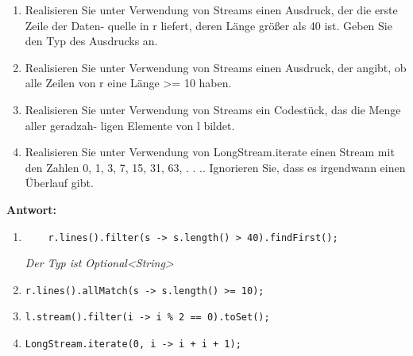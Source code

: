 \begin{enumerate}
    \item Realisieren Sie unter Verwendung von Streams einen Ausdruck, der die erste
          Zeile der Daten- quelle in r liefert, deren Länge größer als 40 ist. Geben Sie
          den Typ des Ausdrucks an.
    \item Realisieren Sie unter Verwendung von Streams einen Ausdruck, der angibt, ob
          alle Zeilen von r eine Länge >= 10 haben.
    \item Realisieren Sie unter Verwendung von Streams ein Codestück, das die Menge aller
          geradzah- ligen Elemente von l bildet.
    \item Realisieren Sie unter Verwendung von LongStream.iterate einen Stream mit den
          Zahlen 0, 1, 3, 7, 15, 31, 63, . . .. Ignorieren Sie, dass es irgendwann einen
          Überlauf gibt.
\end{enumerate}

\textbf{Antwort:}

\begin{enumerate}
    \item \begin{lstlisting}
    r.lines().filter(s -> s.length() > 40).findFirst();
\end{lstlisting} \textit{Der Typ ist Optional<String>}
    \item \begin{lstlisting}
r.lines().allMatch(s -> s.length() >= 10);
\end{lstlisting}
    \item \begin{lstlisting}
l.stream().filter(i -> i % 2 == 0).toSet();
\end{lstlisting}
    \item \begin{lstlisting}
LongStream.iterate(0, i -> i + i + 1);
\end{lstlisting}
\end{enumerate}


